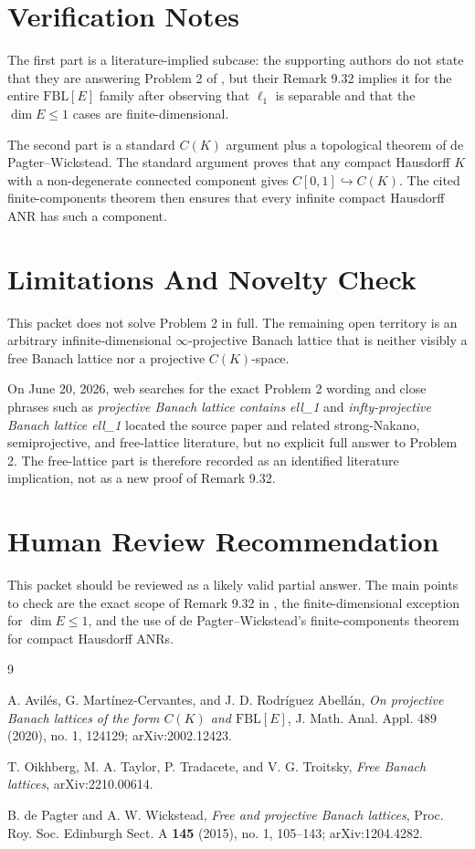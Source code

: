 \documentclass[11pt]{article}
\newcommand{\FBL}{\mathrm{FBL}}
\newcommand{\ellone}{\ell_1}
\begin{document}
\section*{Verification Notes}

The first part is a literature-implied subcase: the supporting authors do not
state that they are answering Problem 2 of \cite{AMRA}, but their Remark 9.32
implies it for the entire \(\FBL[E]\) family after observing that \(\ellone\)
is separable and that the \(\dim E\le1\) cases are finite-dimensional.

The second part is a standard \(C(K)\) argument plus a topological theorem of
de Pagter--Wickstead. The standard argument proves that any compact Hausdorff
\(K\) with a non-degenerate connected component gives
\(C[0,1]\hookrightarrow C(K)\). The cited finite-components theorem then
ensures that every infinite compact Hausdorff ANR has such a component.

\section*{Limitations And Novelty Check}

This packet does not solve Problem 2 in full. The remaining open territory is
an arbitrary infinite-dimensional \(\infty\)-projective Banach lattice that
is neither visibly a free Banach lattice nor a projective \(C(K)\)-space.

On June 20, 2026, web searches for the exact Problem 2 wording and close
phrases such as \emph{projective Banach lattice contains ell\_1} and
\emph{infty-projective Banach lattice ell\_1} located the source paper and
related strong-Nakano, semiprojective, and free-lattice literature, but no
explicit full answer to Problem 2. The free-lattice part is therefore recorded
as an identified literature implication, not as a new proof of Remark 9.32.

\section*{Human Review Recommendation}

This packet should be reviewed as a likely valid partial answer. The main
points to check are the exact scope of Remark 9.32 in \cite{OTTT}, the
finite-dimensional exception for \(\dim E\le1\), and the use of
de Pagter--Wickstead's finite-components theorem for compact Hausdorff ANRs.

\begin{thebibliography}{9}

A. Avil\'es, G. Mart\'inez-Cervantes, and J. D. Rodr\'iguez Abell\'an,
\emph{On projective Banach lattices of the form \(C(K)\) and \(\FBL[E]\)},
J. Math. Anal. Appl. 489 (2020), no. 1, 124129; arXiv:2002.12423.

T. Oikhberg, M. A. Taylor, P. Tradacete, and V. G. Troitsky,
\emph{Free Banach lattices}, arXiv:2210.00614.

B. de Pagter and A. W. Wickstead,
\emph{Free and projective Banach lattices},
Proc. Roy. Soc. Edinburgh Sect. A \textbf{145} (2015), no. 1, 105--143;
arXiv:1204.4282.

\end{thebibliography}
\end{document}
